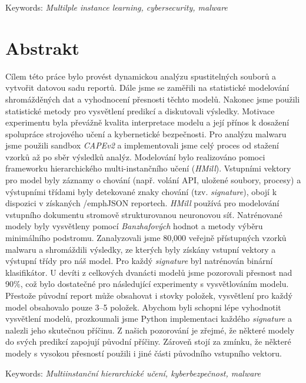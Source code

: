\documentclass[11pt,twoside,a4paper]{book}
\begin{document}
	\vspace{5mm}

	\noindent Keywords: \emph{Multilple instance learning, cybersecurity, malware}

	\let\cleardoublepage\clearpage

	\noindent
	\chapter*{Abstrakt}
	\noindent
	Cílem této práce bylo provést dynamickou analýzu spustitelných souborů a vytvořit datovou sadu reportů. Dále jsme se zaměřili na statistické modelování shromážděných dat a vyhodnocení přesnosti těchto modelů. Nakonec jsme použili statistické metody pro vysvětlení predikcí a diskutovali výsledky. Motivace experimentu byla převážně kvalita interpretace modelu a její přínos k dosažení spolupráce strojového učení a kybernetické bezpečnosti. Pro analýzu malwaru jsme použili sandbox \emph{CAPEv2} a implementovali jsme celý proces od stažení vzorků až po sběr výsledků analýz. Modelování bylo realizováno pomoci frameworku hierarchického multi-instančního učení (\emph{HMill}). Vstupními vektory pro model byly záznamy o chování (např. volání API, uložené soubory, procesy) a výstupními třídami byly detekované znaky chování (tzv. \emph{signature}), obojí k dispozici v získaných /emph{JSON} reportech. \emph{HMill} používá pro modelování vstupního dokumentu stromově strukturovanou neuronovou síť. Natrénované modely byly vysvětleny pomocí \emph{Banzhafových} hodnot a metody výběru minimálního podstromu. Zanalyzovali jsme 80,000 veřejně přístupných vzorků malwaru a shromáždili výsledky, ze kterých byly získány vstupní vektory a výstupní třídy pro náš model. Pro každý \emph{signature} byl natrénován binární klasifikátor. U devíti z celkových dvanácti modelů jsme pozorovali přesnost nad 90\%, což bylo dostatečné pro následující experimenty s vysvětlováním modelu. Přestože původní report může obsahovat i stovky položek, vysvětlení pro každý model obsahovalo pouze 3--5 položek. Abychom byli schopni lépe vyhodnotit vysvětlení modelů, prozkoumali jsme Python implementaci každého \emph{signature} a nalezli jeho skutečnou příčinu. Z našich pozorování je zřejmé, že některé modely do svých predikcí zapojují původní příčiny. Zároveň stojí za zmínku, že některé modely s vysokou přesností použili i jiné části původního vstupního vektoru. \

	\vspace{5mm}

	\noindent Keywords: \emph{Multiinstanční hierarchické učení, kyberbezpečnost, malware}
\end{document}
